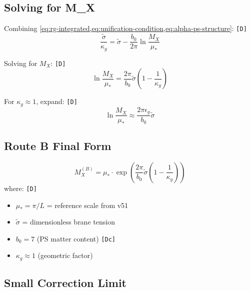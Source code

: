 \documentclass[11pt,a4paper]{article}
\newcommand{\tagD}{\textcolor{green!50!black}{\texttt{[D]}}}
\newcommand{\tagDc}{\textcolor{blue!70!black}{\texttt{[Dc]}}}
\theoremstyle{definition}
\begin{document}
\subsection{Solving for M\_X}
\label{subsec:solving-mx}

Combining \cref{eq:rg-integrated,eq:unification-condition,eq:alpha-ps-structure}: \tagD{}
\begin{equation}
\label{eq:mx-equation}
\frac{\tilde{\sigma}}{\kappa_g} = \tilde{\sigma} - \frac{b_0}{2\pi} \ln\frac{M_X}{\mu_*}
\end{equation}

Solving for $M_X$: \tagD{}
\begin{equation}
\label{eq:mx-solution}
\ln\frac{M_X}{\mu_*} = \frac{2\pi}{b_0} \tilde{\sigma} \left(1 - \frac{1}{\kappa_g}\right)
\end{equation}

For $\kappa_g \approx 1$, expand: \tagD{}
\begin{equation}
\label{eq:mx-expanded}
\ln\frac{M_X}{\mu_*} \approx \frac{2\pi \epsilon_g}{b_0} \tilde{\sigma}
\end{equation}

\subsection{Route B Final Form}
\label{subsec:route-b-final}

\begin{derivbox}
\begin{equation}
\label{eq:mx-route-b-boxed}
\boxed{M_X^{(B)} = \mu_* \cdot \exp\left(\frac{2\pi}{b_0} \tilde{\sigma} \left(1 - \frac{1}{\kappa_g}\right)\right)}
\end{equation}
where: \tagD{}
\begin{itemize}
  \item $\mu_* = \pi/L$ = reference scale from v51
  \item $\tilde{\sigma}$ = dimensionless brane tension
  \item $b_0 = 7$ (PS matter content) \tagDc{}
  \item $\kappa_g \approx 1$ (geometric factor)
\end{itemize}
\end{derivbox}

\subsection{Small Correction Limit}
\label{subsec:small-correction}
\end{document}
